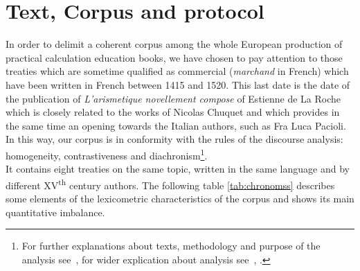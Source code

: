 \documentclass[preprint]{elsarticle}
\begin{document}
\section{Text, Corpus and protocol}\label{corpus}

In order to delimit a coherent corpus among the whole European production of practical calculation education books, we have chosen to pay attention to those treaties which are sometime qualified as commercial (\textit{marchand} in French) which have been written in French between 1415 and 1520. This last date is the date of the publication of \textit{L'arismetique novellement compose} of Estienne de La Roche which is closely related to the works of Nicolas Chuquet and which provides in the same time an opening towards the Italian authors, such as Fra Luca Pacioli. In this way, our corpus is in conformity with the rules of the discourse analysis: homogeneity, contrastiveness and diachronism\footnote{For further explanations about texts, methodology and purpose of the analysis see~\cite{lamasse2012}, for wider explication about analysis see~\cite{Mayaffre2005}, \cite{Rastier2011}.}. \\

It contains eight treaties on the same topic, written in the same language and by different XV\textsuperscript{th} century authors. The following table \ref{tab:chronomss} describes some elements of the lexicometric characteristics of the corpus and shows its main quantitative imbalance.
\end{document}
